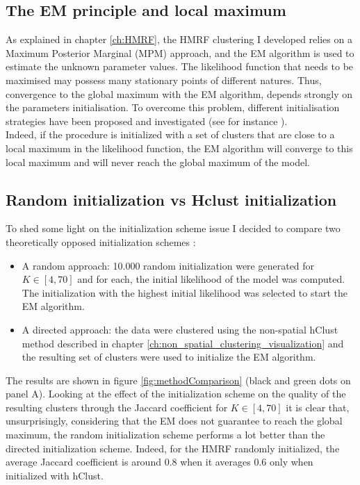 	\subsection{The EM principle and local maximum}
As explained in chapter \ref{ch:HMRF}, the HMRF clustering I developed relies on a Maximum Posterior Marginal (MPM) approach, and the EM algorithm is used to estimate the unknown parameter values. The likelihood function that needs to be maximised may possess many stationary points of different natures. Thus, convergence to the global maximum with the EM algorithm, depends strongly on the parameters initialisation. To overcome this problem, different initialisation strategies have been proposed and investigated (see for instance \cite{biernacki03,karlis03,mclachlan04}).\\

Indeed, if the procedure is initialized with a set of clusters that are close to a local maximum in the likelihood function, the EM algorithm will converge to this local maximum and will never reach the global maximum of the model.

	\subsection{Random initialization vs Hclust initialization}
	To shed some light on the initialization scheme issue I decided to compare two theoretically opposed initialization schemes :
\begin{itemize}
	\item A random approach: 10.000 random initialization were generated for $K \in [4,70]$ and for each, the initial likelihood of the model was computed. The initialization with the highest initial likelihood was selected to start the EM algorithm.
	\item A directed approach: the data were clustered using the non-spatial hClust method described in chapter \ref{ch:non_spatial_clustering_visualization} and the resulting set of clusters were used to initialize the EM algorithm.
\end{itemize}

The results are shown in figure \ref{fig:methodComparison} (black and green dots on panel A). Looking at the effect of the initialization scheme on the quality of the resulting clusters through the Jaccard coefficient for $K \in [4,70]$ it is clear that, unsurprisingly, considering that the EM does not guarantee to reach the global maximum, the random initialization scheme performs a lot better than the directed initialization scheme. Indeed, for the HMRF randomly initialized, the average Jaccard coefficient is around $0.8$ when it averages $0.6$ only when initialized with hClust.\\

